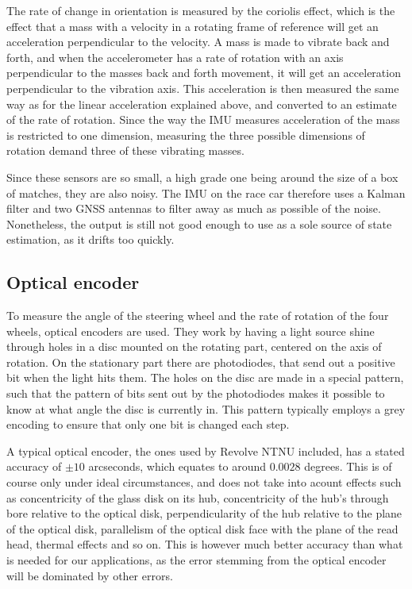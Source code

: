 The rate of change in orientation is measured by the coriolis effect, which is the effect that a mass with a velocity in a rotating frame of reference will get an acceleration perpendicular to the velocity. A mass is made to vibrate back and forth, and when the accelerometer has a rate of rotation  with an axis perpendicular to the masses back and forth movement, it will get an acceleration perpendicular to the vibration axis. This acceleration is then measured the same way as for the linear acceleration explained above, and converted to an estimate of the rate of rotation. Since the way the IMU measures acceleration of the mass is restricted to one dimension, measuring the three possible dimensions of rotation demand three of these vibrating masses. 

Since these sensors are so small, a high grade one being around the size of a box of matches, they are also noisy. The IMU on the race car therefore uses a Kalman filter and two GNSS antennas to filter away as much as possible of the noise. Nonetheless, the output is still not good enough to use as a sole source of state estimation, as it drifts too quickly.
\subsection{Optical encoder}

To measure the angle of the steering wheel and the rate of rotation of the four wheels, optical encoders are used. They work by having a light source shine through holes in a disc mounted on the rotating part, centered on the axis of rotation. On the stationary part there are photodiodes, that send out a positive bit when the light hits them. The holes on the disc are made in a special pattern, such that the pattern of bits sent out by the photodiodes makes it possible to know at what angle the disc is currently in. This pattern typically employs a grey encoding to ensure that only one bit is changed each step. 

A typical optical encoder, the ones used by Revolve NTNU included, has a stated accuracy of $\pm 10$ arcseconds, which equates to around $0.0028$ degrees. This is of course only under ideal circumstances, and does not take into acount effects such as concentricity of the glass disk on its hub, concentricity of the hub’s through bore relative to the optical disk, perpendicularity of the hub relative to the plane of the optical disk, parallelism of the optical disk face with the plane of the read head, thermal effects and so on. This is however much better accuracy than what is needed for our applications, as the error stemming from the optical encoder will be dominated by other errors.

